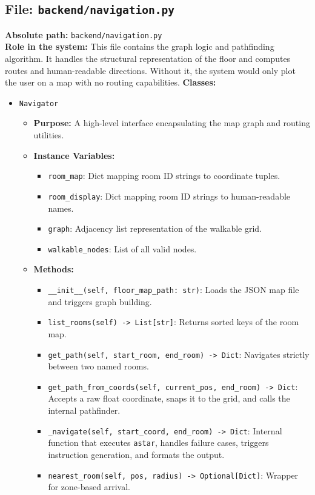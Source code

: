 \documentclass[11pt,a4paper]{article}
\begin{document}
\subsection{File: \texttt{backend/navigation.py}}
\textbf{Absolute path:} \texttt{backend/navigation.py}\\
\textbf{Role in the system:} This file contains the graph logic and pathfinding algorithm. It handles the structural representation of the floor and computes routes and human-readable directions. Without it, the system would only plot the user on a map with no routing capabilities.
\textbf{Classes:}
\begin{itemize}
\item \texttt{Navigator}
\begin{itemize}
\item \textbf{Purpose:} A high-level interface encapsulating the map graph and routing utilities.
\item \textbf{Instance Variables:}
\begin{itemize}
\item \texttt{room\_map}: Dict mapping room ID strings to coordinate tuples.
\item \texttt{room\_display}: Dict mapping room ID strings to human-readable names.
\item \texttt{graph}: Adjacency list representation of the walkable grid.
\item \texttt{walkable\_nodes}: List of all valid nodes.
\end{itemize}
\item \textbf{Methods:}
\begin{itemize}
\item \texttt{\_\_init\_\_(self, floor\_map\_path: str)}: Loads the JSON map file and triggers graph building.
\item \texttt{list\_rooms(self) -> List[str]}: Returns sorted keys of the room map.
\item \texttt{get\_path(self, start\_room, end\_room) -> Dict}: Navigates strictly between two named rooms.
\item \texttt{get\_path\_from\_coords(self, current\_pos, end\_room) -> Dict}: Accepts a raw float coordinate, snaps it to the grid, and calls the internal pathfinder.
\item \texttt{\_navigate(self, start\_coord, end\_room) -> Dict}: Internal function that executes \texttt{astar}, handles failure cases, triggers instruction generation, and formats the output.
\item \texttt{nearest\_room(self, pos, radius) -> Optional[Dict]}: Wrapper for zone-based arrival.
\end{itemize}
\end{itemize}
\end{itemize}
\end{document}

